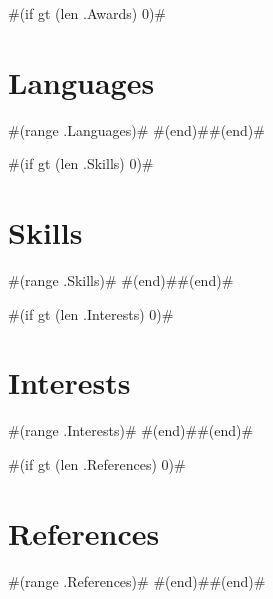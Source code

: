 \documentclass[11pt,letterpaper,sans]{moderncv}        %
\begin{document}
#(if gt (len .Awards) 0)#\section{Languages}
#(range .Languages)#
#(end)##(end)#

#(if gt (len .Skills) 0)#\section{Skills}
#(range .Skills)#
#(end)##(end)#

#(if gt (len .Interests) 0)#\section{Interests}
#(range .Interests)#
#(end)##(end)#

#(if gt (len .References) 0)#\section{References}
#(range .References)#
#(end)##(end)#

\nocite{*}



\end{document}
